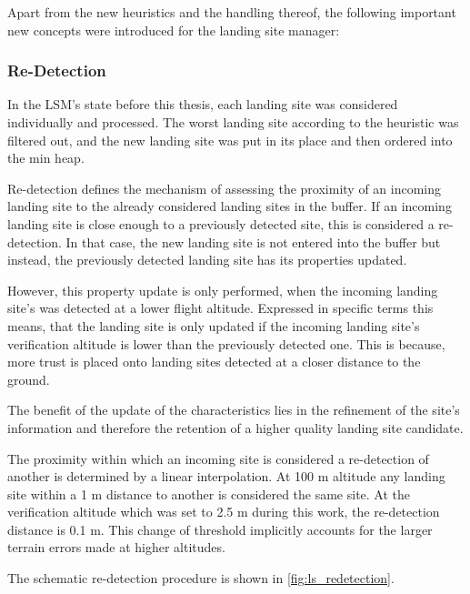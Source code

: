 Apart from the new heuristics and the handling thereof, the following important new concepts were introduced for the landing site manager:

\subsubsection{Re-Detection}\label{subsubsec:redetection}

In the LSM's state before this thesis, each landing site was considered individually and processed. The worst landing site according to the heuristic was filtered out, and the new landing site was put in its place and then ordered into the min heap.

Re-detection defines the mechanism of assessing the proximity of an incoming landing site to the already considered landing sites in the buffer. If an incoming landing site is close enough to a previously detected site, this is considered a re-detection. In that case, the new landing site is not entered into the buffer but instead, the previously detected landing site has its properties updated.

However, this property update is only performed, when the incoming landing site's was detected at a lower flight altitude. Expressed in specific terms this means, that the landing site is only updated if the incoming landing site's verification altitude is lower than the previously detected one. This is because, more trust is placed onto landing sites detected at a closer distance to the ground. 

The benefit of the update of the characteristics lies in the refinement of the site's information and therefore the retention of a higher quality landing site candidate.

The proximity within which an incoming site is considered a re-detection of another is determined by a linear interpolation. At 100 m altitude any landing site within a 1 m distance to another is considered the same site. At the verification altitude which was set to 2.5 m during this work, the re-detection distance is 0.1 m. This change of threshold implicitly accounts for the larger terrain errors made at higher altitudes. 

The schematic re-detection procedure is shown in \cref{fig:ls_redetection}.

